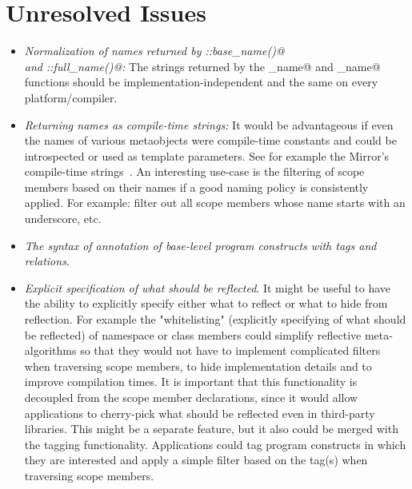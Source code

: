 \section{Unresolved Issues}

\begin{itemize}
	\item {\em Normalization of names returned by \verb@Named::base_name()@\\and \verb@Named::full_name()@:}
	The strings returned by the \verb@base_name@ and \verb@full_name@ functions should be
	implementation-independent and the same on every platform/compiler.
	
	\item {\em Returning names as compile-time strings:} It would be advantageous if even
	the names of various metaobjects were compile-time constants and could be introspected
	or used as template parameters. See for example the Mirror's compile-time strings~\cite{mirror-ct-strings}.
	An interesting use-case is the filtering of scope members based on their names
	if a good naming policy is consistently applied. For example: filter out all scope
	members whose name starts with an underscore, etc.

	\item {\em The syntax of annotation of base-level program constructs with tags and relations}.

	\item {\em Explicit specification of what should be reflected}. It might be useful to have
	the ability to explicitly specify either what to reflect or what to hide from reflection.
	For example the "whitelisting" (explicitly specifying of what should be reflected) of namespace
	or class members could simplify reflective meta-algorithms so that they would not have
	to implement complicated filters when traversing scope members, to hide implementation details and
	to improve compilation times. It is important that this functionality is decoupled from the
	scope member declarations, since it would allow applications to cherry-pick what should be
	reflected even in third-party libraries.
	This might be a separate feature, but it also could be merged with the tagging functionality.
	Applications could tag program constructs in which they are interested and apply a simple
	filter based on the tag(s) when traversing scope members.
\end{itemize}
